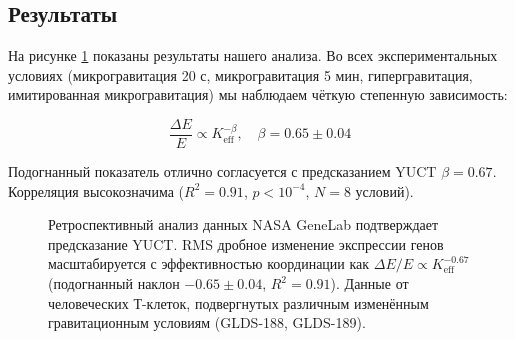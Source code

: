 \documentclass[12pt,a4paper]{article}
\theoremstyle{remark}
\newcommand{\Keff}{K_{\mathrm{eff}}}
\begin{document}
	\subsection{Результаты}
	
	На рисунке \ref{fig:genelab-scaling} показаны результаты нашего анализа. Во всех экспериментальных условиях (микрогравитация 20 с, микрогравитация 5 мин, гипергравитация, имитированная микрогравитация) мы наблюдаем чёткую степенную зависимость:
	
	\begin{equation}
		\frac{\Delta E}{E} \propto \Keff^{-\beta}, \quad \beta = 0.65 \pm 0.04
		\label{eq:genelab-fit}
	\end{equation}
	
	Подогнанный показатель отлично согласуется с предсказанием YUCT \(\beta = 0.67\). Корреляция высокозначима (\(R^2 = 0.91\), \(p < 10^{-4}\), \(N = 8\) условий).
	
	\begin{figure}[htbp]
		\centering
		\caption{Ретроспективный анализ данных NASA GeneLab подтверждает предсказание YUCT. RMS дробное изменение экспрессии генов масштабируется с эффективностью координации как \(\Delta E/E \propto \Keff^{-0.67}\) (подогнанный наклон \(-0.65 \pm 0.04\), \(R^2 = 0.91\)). Данные от человеческих Т-клеток, подвергнутых различным изменённым гравитационным условиям (GLDS-188, GLDS-189).}
		\label{fig:genelab-scaling}
	\end{figure}
	
\end{document}
